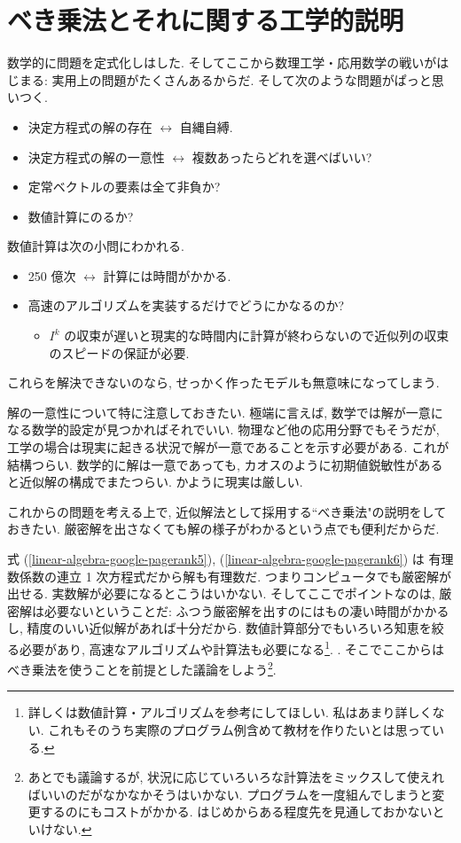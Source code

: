 \documentclass[openany, a4paper, oneside]{jsbook}
\begin{document}
\section{ベき乗法とそれに関する工学的説明}

数学的に問題を定式化しはした.
そしてここから数理工学・応用数学の戦いがはじまる:
実用上の問題がたくさんあるからだ.
そして次のような問題がぱっと思いつく.
\begin{itemize}
\item 決定方程式の解の存在 $\leftrightarrow$ 自縄自縛.
\item 決定方程式の解の一意性 $\leftrightarrow$ 複数あったらどれを選べばいい?
\item 定常ベクトルの要素は全て非負か?
\item 数値計算にのるか?
\end{itemize}
数値計算は次の小問にわかれる.
\begin{itemize}
\item 250 億次 $\leftrightarrow$ 計算には時間がかかる.
\item 高速のアルゴリズムを実装するだけでどうにかなるのか?
\begin{itemize}
\item $I^k$ の収束が遅いと現実的な時間内に計算が終わらないので近似列の収束のスピードの保証が必要.
\end{itemize}
\end{itemize}
これらを解決できないのなら, せっかく作ったモデルも無意味になってしまう.
\begin{rem}[解の一意性]
解の一意性について特に注意しておきたい.
極端に言えば, 数学では解が一意になる数学的設定が見つかればそれでいい.
物理など他の応用分野でもそうだが, 工学の場合は現実に起きる状況で解が一意であることを示す必要がある.
これが結構つらい.
数学的に解は一意であっても, カオスのように初期値鋭敏性があると近似解の構成でまたつらい.
かように現実は厳しい.
\end{rem}

これからの問題を考える上で, 近似解法として採用する``べき乗法"の説明をしておきたい.
厳密解を出さなくても解の様子がわかるという点でも便利だからだ.

式 (\ref{linear-algebra-google-pagerank5}), (\ref{linear-algebra-google-pagerank6}) は
有理数係数の連立 1 次方程式だから解も有理数だ.
つまりコンピュータでも厳密解が出せる.
実数解が必要になるとこうはいかない.
そしてここでポイントなのは, 厳密解は必要ないということだ:
ふつう厳密解を出すのにはもの凄い時間がかかるし, 精度のいい近似解があれば十分だから.
数値計算部分でもいろいろ知恵を絞る必要があり, 高速なアルゴリズムや計算法も必要になる\footnote{詳しくは数値計算・アルゴリズムを参考にしてほしい.
私はあまり詳しくない.
これもそのうち実際のプログラム例含めて教材を作りたいとは思っている.}.
.
そこでここからはべき乗法を使うことを前提とした議論をしよう\footnote{あとでも議論するが,
状況に応じていろいろな計算法をミックスして使えればいいのだがなかなかそうはいかない.
プログラムを一度組んでしまうと変更するのにもコストがかかる.
はじめからある程度先を見通しておかないといけない.}.
\end{document}
